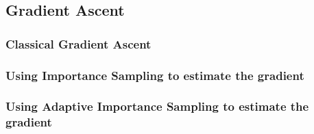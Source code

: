 \subsection{Gradient Ascent}

\subsubsection{Classical Gradient Ascent}



\bigskip

\subsubsection{Using Importance Sampling to estimate the gradient}


\columnbreak

\subsubsection{Using Adaptive Importance Sampling to estimate the gradient}


